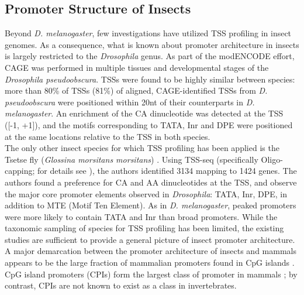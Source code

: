 \documentclass[runningheads,a4paper]{llncs}
\begin{document}
\begin{linenumbers}
\subsection{Promoter Structure of Insects}
Beyond \textit{D. melanogaster}, few investigations have utilized TSS profiling in insect genomes. 
As a consequence, what is known about promoter architecture in insects is largely restricted to the \textit{Drosophila} genus. 
As part of the modENCODE effort, CAGE was performed in multiple tissues and developmental stages of the \textit{Drosophila pseudoobscura}. 
TSSs were found to be highly similar between species: more than 80\% of TSSs (81\%) of aligned, CAGE-identified TSSs from \textit{D. pseudoobscura} were positioned within 20nt of their counterparts in \textit{D. melanogaster}.
An enrichment of the CA dinucleotide was detected at the TSS ([-1, +1]), and the motifs corresponding to TATA, Inr and DPE were positioned at the same locations relative to the TSS in both species.
\\
The only other insect species for which TSS profiling has been applied is the Tsetse fly (\textit{Glossina morsitans morsitans}) \cite{Mwangi:2015kn}. 
Using TSS-seq (specifically Oligo-capping; for details see \cite{Tsuchihara:2009dm}), the authors identified 3134 mapping to 1424 genes. 
The authors found a preference for CA and AA dinucleotides at the TSS, and observe the major core promoter elements observed in \textit{Drosophila}: TATA, Inr, DPE, in addition to MTE (Motif Ten Element).
As in \textit{D. melanogaster}, peaked promoters were more likely to contain TATA and Inr than broad promoters. 
While the taxonomic sampling of species for TSS profiling has been limited, the existing studies are sufficient to provide a general picture of insect promoter architecture.
A major demarcation between the promoter architecture of insects and mammals appears to be the large fraction of mammalian promoters found in CpG islands \cite{Mwangi:2015kn}.
CpG island promoters (CPIs) form the largest class of promoter in mammals \cite{Cvetesic:2017hl}; by contrast, CPIs are not known to exist as a class in invertebrates.



\end{linenumbers}
\end{document}
